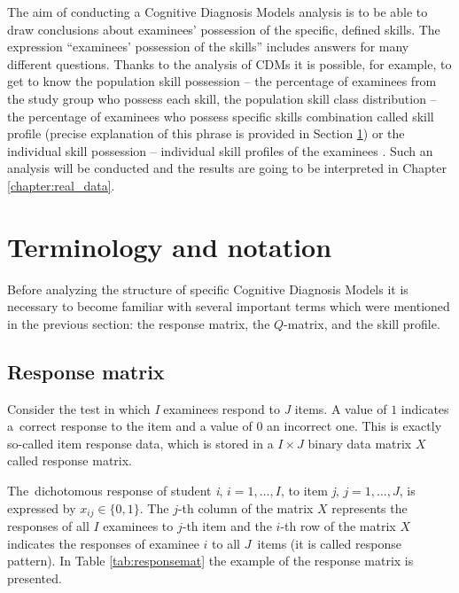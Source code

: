\documentclass[english]{pwr_wmat_praca_dyplomowa}
\theoremstyle{plain}
\theoremstyle{definition}
\numberwithin{theorem}{chapter}
\begin{document}
The aim of conducting a Cognitive Diagnosis Models analysis is to be able to draw conclusions about examinees’ possession of the specific, defined skills. The expression ``examinees’ possession of the skills'' includes answers for many different questions. Thanks to the analysis of CDMs it is possible, for example, to get to know the population skill possession -- the percentage of examinees from the study group who possess each skill, the population skill class distribution -- the percentage of examinees who possess specific skills combination called skill profile (precise explanation of this phrase is provided in Section \ref{section:term_notation}) or the individual skill possession -- individual skill profiles of the examinees \cite{cdm_in_r}. Such an analysis will be conducted and the results are going to be interpreted in Chapter \ref{chapter:real_data}.

\section{Terminology and notation}\label{section:term_notation}

Before analyzing the structure of specific Cognitive Diagnosis Models it is necessary to become familiar with several important terms which were mentioned in the previous section: the response matrix, the $Q$-matrix, and the skill profile.

\subsection{Response matrix}

Consider the test in which \textit{I} examinees respond to \textit{J} items. A value of $1$ indicates a~correct response to the item and a value of $0$ an incorrect one. This is exactly so-called item response data, which is stored in a $I \times J$ binary data matrix $X$ called response matrix.

The~dichotomous response of student \textit{i}, $i = 1, \ldots , I$, to item \textit{j}, $j = 1, \ldots , J$, is expressed by $x_{ij} \in \{0,1\}$. The $j$-th column of the matrix $X$ represents the responses of all $I$ examinees to $j$-th item and the $i$-th row of the matrix $X$ indicates the responses of examinee $i$ to all $J$~items (it is called response pattern). In Table \ref{tab:responsemat} the example of the response matrix is presented.
\end{document}

